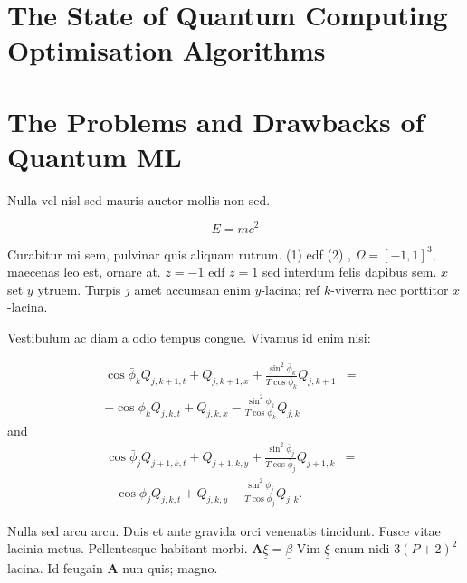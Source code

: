 \documentclass[a0,portrait]{a0poster}
\begin{document}
\begin{multicols}{2}
\begin{minipage}[c]{0.45\linewidth}
\end{minipage}%

\section*{The State of Quantum Computing Optimisation  Algorithms}%


\section*{The Problems and Drawbacks of Quantum ML}
Nulla vel nisl sed mauris auctor mollis non sed. 

\begin{equation}
E = mc^{2}
\label{eqn:Einstein}
\end{equation}

Curabitur mi sem, pulvinar quis aliquam rutrum. (1) edf (2)
, $\Omega=[-1,1]^3$, maecenas leo est, ornare at. $z=-1$ edf $z=1$ sed interdum felis dapibus sem. $x$ set $y$ ytruem. 
Turpis $j$ amet accumsan enim $y$-lacina; 
ref $k$-viverra nec porttitor $x$-lacina. 

Vestibulum ac diam a odio tempus congue. Vivamus id enim nisi:

\begin{eqnarray}
\cos\bar{\phi}_k Q_{j,k+1,t} + Q_{j,k+1,x}+\frac{\sin^2\bar{\phi}_k}{T\cos\bar{\phi}_k} Q_{j,k+1} &=&\nonumber\\ 
-\cos\phi_k Q_{j,k,t} + Q_{j,k,x}-\frac{\sin^2\phi_k}{T\cos\phi_k} Q_{j,k}\label{edgek}
\end{eqnarray}
and
\begin{eqnarray}
\cos\bar{\phi}_j Q_{j+1,k,t} + Q_{j+1,k,y}+\frac{\sin^2\bar{\phi}_j}{T\cos\bar{\phi}_j} Q_{j+1,k}&=&\nonumber \\
-\cos\phi_j Q_{j,k,t} + Q_{j,k,y}-\frac{\sin^2\phi_j}{T\cos\phi_j} Q_{j,k}.\label{edgej}
\end{eqnarray} 

Nulla sed arcu arcu. Duis et ante gravida orci venenatis tincidunt. Fusce vitae lacinia metus. Pellentesque habitant morbi. $\mathbf{A}\underline{\xi}=\underline{\beta}$ Vim $\underline{\xi}$ enum nidi $3(P+2)^{2}$ lacina. Id feugain $\mathbf{A}$ nun quis; magno.


\end{multicols}
\end{document}
